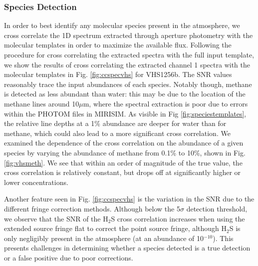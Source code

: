 \subsubsection{Species Detection}
In order to best identify any molecular species present in the atmosphere, we cross correlate the 1D spectrum extracted through aperture photometry with the molecular templates in order to maximize the available flux.
Following the procedure for cross correlating the extracted spectra with the full input template, we show the results of cross correlating the extracted channel 1 spectra with the molecular templates in Fig. \ref{fig:ccspecvhs} for VHS1256b.
The SNR values reasonably trace the input abundances of each species.
Notably though, methane is detected as less abundant than water: this may be due to the location of the methane lines around 10$\mu$m, where the spectral extraction is poor due to errors within the PHOTOM files in MIRISIM.
As visible in Fig \ref{fig:speciestemplates}, the relative line depths at a 1\% abundance are deeper for water than for methane, which could also lead to a more significant cross correlation.
We examined the dependence of the cross correlation on the abundance of a given species by varying the abundance of methane from 0.1\% to 10\%, shown in Fig. \ref{fig:vhsmeth}.
We see that within an order of magnitude of the true value, the cross correlation is relatively constant, but drops off at significantly higher or lower concentrations.

Another feature seen in Fig. \ref{fig:ccspecvhs} is the variation in the SNR due to the different fringe correction methods. 
Although below the 5$\sigma$ detection threshold, we observe that the SNR of the H$_{2}$S cross correlation increases when using the extended source fringe flat to correct the point source fringe, although H$_{2}$S is only negligibly present in the atmosphere (at an abundance of 10$^{-10}$).
This presents challenges in determining whether a species detected is a true detection or a false positive due to poor corrections.

